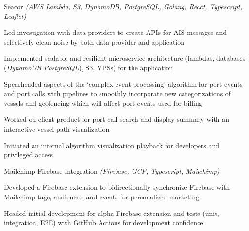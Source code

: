 \begin{cventries}
  \cvcustombody
      {Seacor \emph{(AWS Lambda, S3, DynamoDB, PostgreSQL, Golang, React, Typescript, Leaflet)}}
      {
      \begin{cvitems} %
        \item {Led investigation with data providers to create APIs for AIS messages and selectively clean noise by both data provider and application}
        \item {Implemented scalable and resilient microservice architecture (lambdas, databases (\emph{DynamoDB \rightarrow PostgreSQL}), S3, VPSs) for the application}
        \item {Spearheaded aspects of the `complex event processing' algorithm for port events and port calls with pipelines to smoothly incorporate new categorizations of vessels and geofencing which will affect port events used for billing}
        \item {Worked on client product for port call search and display summary with an interactive vessel path visualization}
        \item {Initiated an internal algorithm visualization playback for developers and privileged access}
      \end{cvitems}
    }

  \cvcustombody
      {Mailchimp Firebase Integration \emph{(Firebase, GCP, Typescript, Mailchimp)}}
      {
      \begin{cvitems} %
        \item {Developed a Firebase extension to bidirectionally synchronize Firebase with Mailchimp tags, audiences, and events for personalized marketing}
        \item {Headed initial development for alpha Firebase extension and tests (unit, integration, E2E) with GitHub Actions for development confidence}
      \end{cvitems}
    }

\end{cventries}
